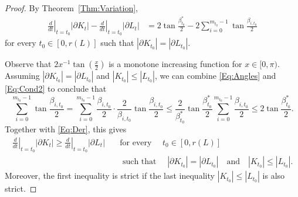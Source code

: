 \documentclass[10pt,a4paper]{amsart}
\renewcommand{\ge}{\geqslant}
\renewcommand{\le}{\leqslant}
\begin{document}
\begin{proof}
By Theorem~\ref{Thm:Variation},
\begin{equation}
\label{Eq:Der}
\begin{aligned}
    \left.\frac{d}{dt}\right|_{t=t_0}|\partial K_t| - \left.\frac{d}{dt}\right|_{t=t_0}|\partial L_t| &= 2 \tan \frac{\beta^*_{t_0}}{2} - 2 \sum_{i=0}^{m_{t_0}-1} \tan \frac{\beta_{i,t_0}}{2}
\end{aligned}
\end{equation}
for every $t_0 \in [0, r(L)]$ such that $|\partial K_{t_0}|= |\partial L_{t_0}|$.



Observe that $2x^{-1}\tan(\frac{x}2)$ is a monotone increasing function for $x \in [0, \pi)$. Assuming $|\partial K_{t_0}| = |\partial L_{t_0}|$ and $|K_{t_0}| \le |L_{t_0}|$, we can combine \eqref{Eq:Angles} and \eqref{Eq:Cond2} to conclude that 
\[
\sum_{i=0}^{m_{t_0}-1} \tan \frac{\beta_{i,t_0}}{2} =\sum_{i=0}^{m_{t_0}-1} \frac{\beta_{i,t_0}}{2} \cdot \frac{2}{\beta_{i,t_0}} \tan \frac{\beta_{i,t_0}}{2} \le \frac{2}{\beta^*_{t_0}} \tan \frac{\beta^*_{t_0}}{2} \sum_{i=0}^{m_{t_0}-1} \frac{\beta_{i,t_0}}{2} \le 2\tan \frac{\beta^*_{t_0}}{2}.
\]
Together with \eqref{Eq:Der}, this gives
\begin{equation}
    \label{Eq:Der2}
    \begin{aligned}    
    \left.\frac{d}{dt}\right|_{t=t_0}|\partial K_t| \ge  \left.\frac{d}{dt}\right|_{t=t_0}|\partial L_t| \quad &\text{for every }\quad t_0 \in [0, r(L)] \quad \\
    &\text{ such that } \quad |\partial K_{t_0}|= |\partial L_{t_0}| \quad \text{and} \quad |K_{t_0}| \le |L_{t_0}|. 
    \end{aligned}
\end{equation}
Moreover, the first inequality is strict if the last inequality $|K_{t_0}| \le |L_{t_0}|$ is also strict. 


\end{proof}
\end{document}
